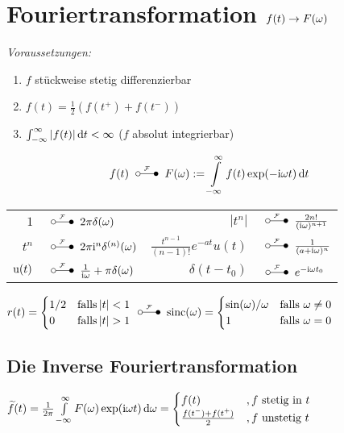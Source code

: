 \documentclass[german,color,5pt]{latex4ei/latex4ei_fs}
\begin{document}
\section{Fouriertransformation \quad $f(t) \rightarrow F(\omega)$}
\begin{sectionbox}
	\emph{Voraussetzungen:}
	\begin{enumerate}
		\item $f$ stückweise stetig differenzierbar
		\item $f(t) = \frac{1}{2}\left(f(t^+) + f(t^-)\right)$
		\item $\int_{-\infty}^{\infty}\abs{f(t)} \diff t < \infty$ ($f$ absolut integrierbar)
	\end{enumerate}
	\begin{emphbox}\vspace{-5pt}
		\[f(t)\FT F(\omega) := \int\limits_{-\infty}^\infty f(t) \exp(-\i \omega t) \diff t\]
	\end{emphbox}
	\begin{tabular}{rl|rl}
		$1$ & \!\!\!\!\!\!\!\!\!\! $\FT 2\pi \delta(\omega)$ & $|t^n|$ & \!\!\!\!\!\!\!\!\!\! $\FT \frac{2n!}{(\i \omega)^{n+1}}$\\
		$t^n$ & \!\!\!\!\!\!\!\!\!\! $\FT 2\pi \i^n \delta^{(n)}(\omega)$ & $\frac{t^{n-1}}{(n-1)!} e^{-at} u(t)$ & \!\!\!\!\!\!\!\!\!\! $\FT \frac{1}{(a+\i \omega)^n}$\\
		$\operatorname{u}(t)$ & \!\!\!\!\!\!\!\!\!\! $\FT \frac{1}{\i \omega} + \pi \delta(\omega)$ & $\delta(t-t_0)$ & \!\!\!\!\!\!\!\!\!\! $\FT e^{-\i \omega t_0}$\\
	\end{tabular}
	$r(t) = \begin{cases}
	1/2 & \text{falls} \abs{t}<1 \\
	0 & \text{falls} \abs{t}>1
	\end{cases}\FT \sinc(\omega) =  \begin{cases}
	\sin(\omega)/\omega & \text{falls } \omega\ne 0 \\
	1 & \text{falls } \omega= 0
	\end{cases}$
	\subsection{Die Inverse Fouriertransformation}
	$\widetilde{f}(t) = \frac{1}{2\pi} \int\limits_{-\infty}^\infty F(\omega) \exp(\i \omega t) \diff \omega = \begin{cases} f(t) &, f \text{ stetig in }t \\ \frac{f(t^-) + f(t^+)}{2} &, f\text{ unstetig }t \end{cases}$
\end{sectionbox}
\end{document}
